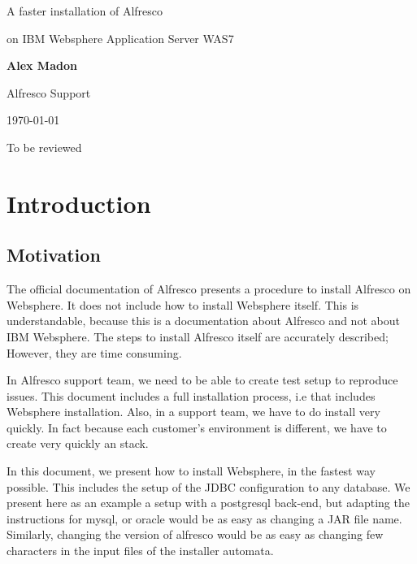 \documentclass[10pt,a4]{article}
\begin{document}
\begin{center}
{\huge A faster installation of Alfresco}

\vspace{5mm}

\Large{on IBM Websphere Application Server WAS7}

\vspace{25mm}

{\bf Alex Madon}

\vspace{5mm}

Alfresco Support

\vspace{5mm}

\today

\vspace{15mm}
{\huge To be reviewed}

\end{center}
\vspace{5mm}

\newpage

\tableofcontents

\newpage

\section{Introduction}
\subsection{Motivation}
The official documentation of Alfresco \cite{officialdoc} presents a procedure to install Alfresco on Websphere. It does not include how to install Websphere itself. This is understandable, because this is a documentation about Alfresco and not about IBM Websphere.
The steps to install Alfresco itself are accurately described; However, they are time consuming.

In Alfresco support team, we need to be able to create test setup to reproduce issues. This document includes a full installation process, i.e that includes Websphere installation. Also, in a support team, we have to do install very quickly. In fact because each customer's environment is different, we have to create very quickly an stack. 

In this document, we present how to install Websphere, in the fastest way possible. This includes the setup of the JDBC configuration to any database. We present here as an example a setup with a postgresql back-end, but adapting the instructions for mysql, or oracle would be as easy as changing a JAR file name. Similarly, changing the version of alfresco would be as easy as changing few characters in the input files of the installer automata.
\end{document}
